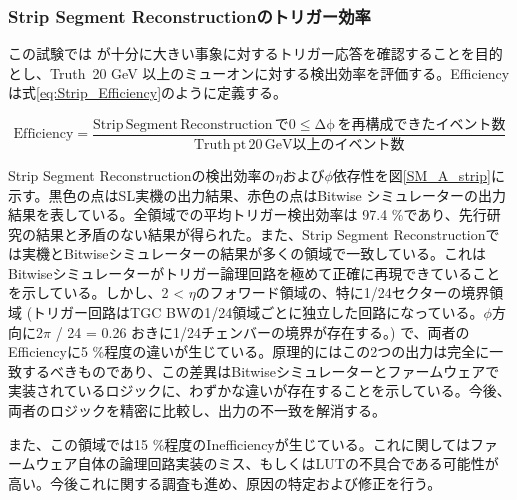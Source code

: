 \subsubsection*{Strip Segment Reconstructionのトリガー効率}
この試験では \pt  が十分に大きい事象に対するトリガー応答を確認することを目的とし、Truth \pt $\,$20 GeV 以上のミューオンに対する検出効率を評価する。Efficiencyは式\ref{eq:Strip_Efficiency}のように定義する。

\begin{equation}
    \mathrm {Efficiency} = \frac{\mathrm{Strip\,Segment \,Reconstruction\,で0\leq\Delta\phi\,を再構成できたイベント数}}{\mathrm{Truth\,pt \,20 \,GeV以上のイベント数}}
    \label{eq:Strip_Efficiency}
\end{equation}

Strip Segment Reconstructionの検出効率の$\eta$および$\phi$依存性を図\ref{SM_A_strip}に示す。黒色の点はSL実機の出力結果、赤色の点はBitwise シミュレーターの出力結果を表している。全領域での平均トリガー検出効率は 97.4 \%であり、先行研究\cite{mt_mino}の結果と矛盾のない結果が得られた。また、Strip Segment Reconstructionでは実機とBitwiseシミュレーターの結果が多くの領域で一致している。これはBitwiseシミュレーターがトリガー論理回路を極めて正確に再現できていることを示している。しかし、2 < $\eta$のフォワード領域の、特に1/24セクターの境界領域 (トリガー回路はTGC BWの1/24領域ごとに独立した回路になっている。$\phi$方向に2$\pi$ / 24 = 0.26 おきに1/24チェンバーの境界が存在する。) で、両者のEfficiencyに5 \%程度の違いが生じている。原理的にはこの2つの出力は完全に一致するべきものであり、この差異はBitwiseシミュレーターとファームウェアで実装されているロジックに、わずかな違いが存在することを示している。今後、両者のロジックを精密に比較し、出力の不一致を解消する。

また、この領域では15 \%程度のInefficiencyが生じている。これに関してはファームウェア自体の論理回路実装のミス、もしくはLUTの不具合である可能性が高い。今後これに関する調査も進め、原因の特定および修正を行う。

